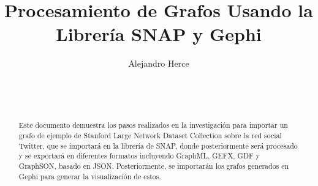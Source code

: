 \documentclass{sig-alternate-05-2015}
\begin{document}

\title{Procesamiento de Grafos Usando la Librería SNAP y Gephi}
%
%
%
%
%

%
\author{
%
%
\alignauthor
Alejandro Herce\\
       \\
       \\
       \\
}

\maketitle
\begin{abstract}
Este documento demuestra los pasos realizados en la investigación para importar un grafo de ejemplo de Stanford Large Network Dataset Collection sobre la red social Twitter, que se importará en la librería de SNAP, donde posteriormente será procesado y se exportará en diferentes formatos incluyendo GraphML, GEFX, GDF y GraphSON, basado en JSON. Posteriormente, se importarán los grafos generados en Gephi para generar la visualización de estos.

\end{abstract}
\end{document}
